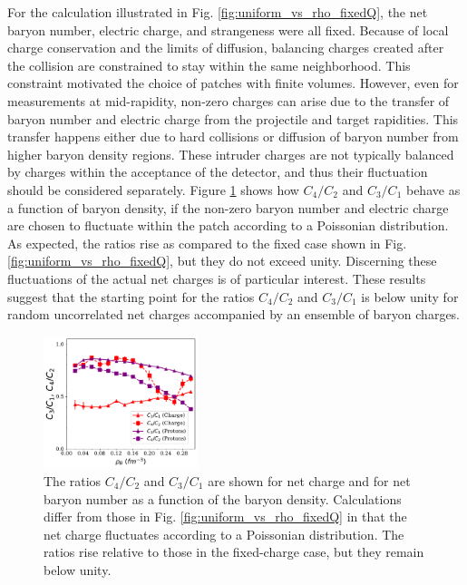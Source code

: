 For the calculation illustrated in Fig. \ref{fig:uniform_vs_rho_fixedQ}, the net baryon number, electric charge, and strangeness were all fixed. Because of local charge conservation and the limits of diffusion, balancing charges created after the collision are constrained to stay within the same neighborhood. This constraint motivated the choice of patches with finite volumes. However, even for measurements at mid-rapidity, non-zero charges can arise due to the transfer of baryon number and electric charge from the projectile and target rapidities. This transfer happens either due to hard collisions or diffusion of baryon number from higher baryon density regions. These intruder charges are not typically balanced by charges within the acceptance of the detector, and thus their fluctuation should be considered separately. Figure \ref{fig:uniform_vs_rho_fluctuatingQ} shows how $C_4/C_2$ and $C_3/C_1$ behave as a function of baryon density, if the non-zero baryon number and electric charge are chosen to fluctuate within the patch according to a Poissonian distribution. As expected, the ratios rise as compared to the fixed case shown in Fig. \ref{fig:uniform_vs_rho_fixedQ}, but they do not exceed unity. Discerning these fluctuations of the actual net charges is of particular interest. These results suggest that the starting point for the ratios $C_4/C_2$ and $C_3/C_1$ is below unity for random uncorrelated net charges accompanied by an ensemble of baryon charges.
\begin{figure}
\centerline{\includegraphics[width=0.4\textwidth]{figs/m_vs_rho_fluctuatingQ}}
\caption{\label{fig:uniform_vs_rho_fluctuatingQ}
The ratios $C_4/C_2$ and $C_3/C_1$ are shown for net charge and for net baryon number as a function of the baryon density. Calculations differ from those in Fig. \ref{fig:uniform_vs_rho_fixedQ} in that the net charge fluctuates according to a Poissonian distribution. The ratios rise relative to those in the fixed-charge case, but they remain below unity.}
\end{figure}


%
